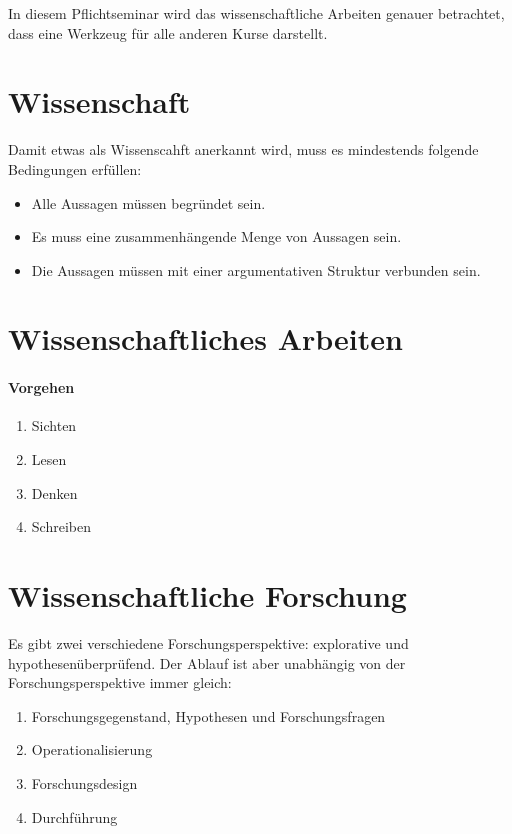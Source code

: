 \documentclass[../main.tex]{subfiles}
\begin{document}
    In diesem Pflichtseminar wird das wissenschaftliche Arbeiten genauer betrachtet, dass eine Werkzeug für alle anderen Kurse darstellt.
    \clearpage

    \section{Wissenschaft}
        Damit etwas als Wissenscahft anerkannt wird, muss es mindestends folgende Bedingungen erfüllen:
        
        \begin{itemize}
            \item Alle Aussagen müssen begründet sein.
            \item Es muss eine zusammenhängende Menge von Aussagen sein.
            \item Die Aussagen müssen mit einer argumentativen Struktur verbunden sein.
        \end{itemize}
        
    \section{Wissenschaftliches Arbeiten}
    
        \paragraph{Vorgehen}
        \begin{enumerate}
            \item Sichten
            \item Lesen
            \item Denken
            \item Schreiben
        \end{enumerate}
        
    \section{Wissenschaftliche Forschung}
        Es gibt zwei verschiedene Forschungsperspektive: explorative und hypothesenüberprüfend. Der Ablauf ist aber unabhängig von der Forschungsperspektive immer gleich:
    
        \begin{enumerate}
            \item Forschungsgegenstand, Hypothesen und Forschungsfragen
            \item Operationalisierung
            \item Forschungsdesign
            \item Durchführung
        \end{enumerate}
        
\end{document}
